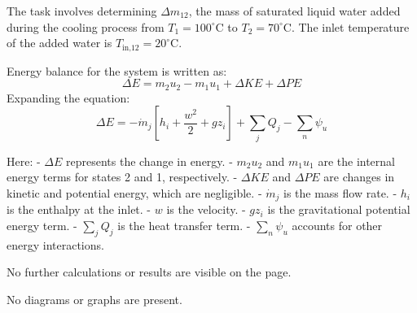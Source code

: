 The task involves determining \( \Delta m_{12} \), the mass of saturated liquid water added during the cooling process from \( T_1 = 100^\circ\text{C} \) to \( T_2 = 70^\circ\text{C} \). The inlet temperature of the added water is \( T_{\text{in,12}} = 20^\circ\text{C} \).

Energy balance for the system is written as:  
\[
\Delta E = m_2 u_2 - m_1 u_1 + \Delta KE + \Delta PE
\]  
Expanding the equation:  
\[
\Delta E = -\dot{m}_j \left[ h_i + \frac{w^2}{2} + g z_i \right] + \sum_j Q_j - \sum_n \psi_u
\]  

Here:  
- \( \Delta E \) represents the change in energy.  
- \( m_2 u_2 \) and \( m_1 u_1 \) are the internal energy terms for states 2 and 1, respectively.  
- \( \Delta KE \) and \( \Delta PE \) are changes in kinetic and potential energy, which are negligible.  
- \( \dot{m}_j \) is the mass flow rate.  
- \( h_i \) is the enthalpy at the inlet.  
- \( w \) is the velocity.  
- \( g z_i \) is the gravitational potential energy term.  
- \( \sum_j Q_j \) is the heat transfer term.  
- \( \sum_n \psi_u \) accounts for other energy interactions.  

No further calculations or results are visible on the page.  

No diagrams or graphs are present.